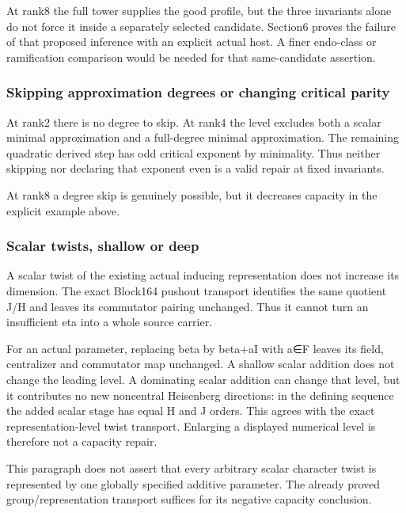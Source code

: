 At rank8 the full tower supplies the good profile, but the three
invariants alone do not force it inside a separately selected candidate.
Section6 proves the failure of that proposed inference with an explicit
actual host. A finer endo-class or ramification comparison would be
needed for that same-candidate assertion.

\hypertarget{dyadic_capacity-skipping-approximation-degrees-or-changing-critical-parity}{%
\subsubsection{Skipping approximation degrees or changing critical
parity}\label{dyadic_capacity-skipping-approximation-degrees-or-changing-critical-parity}}

At rank2 there is no degree to skip. At rank4 the level excludes both a
scalar minimal approximation and a full-degree minimal approximation.
The remaining quadratic derived step has odd critical exponent by
minimality. Thus neither skipping nor declaring that exponent even is a
valid repair at fixed invariants.

At rank8 a degree skip is genuinely possible, but it decreases capacity
in the explicit example above.

\hypertarget{dyadic_capacity-scalar-twists-shallow-or-deep}{%
\subsubsection{Scalar twists, shallow or
deep}\label{dyadic_capacity-scalar-twists-shallow-or-deep}}

A scalar twist of the existing actual inducing representation does not
increase its dimension. The exact Block164 pushout transport identifies
the same quotient J/H and leaves its commutator pairing unchanged. Thus
it cannot turn an insufficient eta into a whole source carrier.

For an actual parameter, replacing beta by beta+aI with a∈F leaves its
field, centralizer and commutator map unchanged. A shallow scalar
addition does not change the leading level. A dominating scalar addition
can change that level, but it contributes no new noncentral Heisenberg
directions: in the defining sequence the added scalar stage has equal H
and J orders. This agrees with the exact representation-level twist
transport. Enlarging a displayed numerical level is therefore not a
capacity repair.

This paragraph does not assert that every arbitrary scalar character
twist is represented by one globally specified additive parameter. The
already proved group/representation transport suffices for its negative
capacity conclusion.

